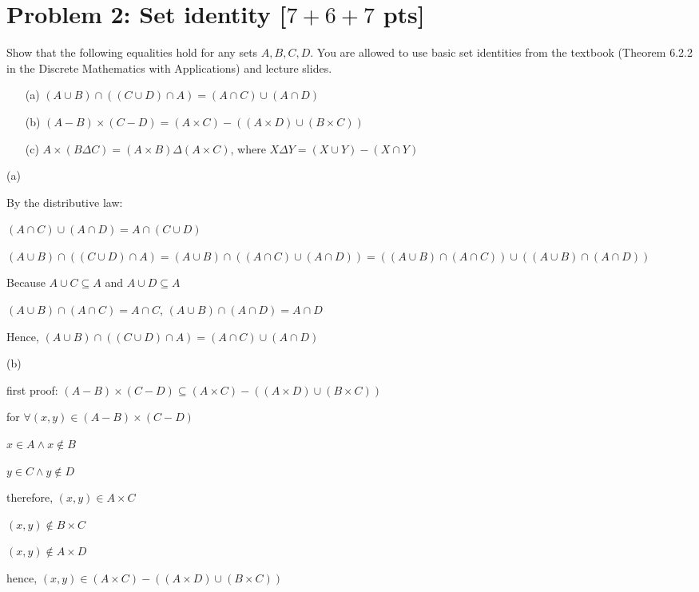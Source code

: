 \documentclass[11pt,twoside]{article}
\newcommand{\problem}[1]{\section*{Problem #1}}
\begin{document}
\problem{2: Set identity [$7+6+7$ pts]}
Show that the following equalities hold for any sets $A,B,C,D$. You are allowed to use basic set identities from the textbook (Theorem 6.2.2 in the Discrete Mathematics with Applications) and lecture slides. 

\begin{enumerate}
    \item[(a)] \( (A \cup B) \cap ((C \cup D) \cap A) = (A \cap C)\cup(A \cap D) \) 
    \item[(b)] $(A-B) \times (C-D) = (A \times C) - ((A \times D) \cup (B \times C))$
    \item[(c)] $A \times (B \Delta C) = (A \times B) \Delta (A \times C)$, where $X \Delta Y = (X \cup Y) - (X \cap Y)$
\end{enumerate}

\hspace*{\fill}

(a)

By the distributive law:

\((A \cap C)\cup(A \cap D) = A\cap(C \cup D)\) 

$ (A \cup B) \cap ((C \cup D) \cap A) = (A \cup B) \cap ((A \cap C)\cup(A \cap D)) = ((A \cup B) \cap (A \cap C))\cup ((A \cup B) \cap (A \cap D))$

Because $ A\cup C \subseteq A $ and $ A\cup D \subseteq A $

$(A \cup B) \cap (A \cap C) = A\cap C$, $(A \cup B) \cap (A \cap D) = A\cap D$

Hence, \( (A \cup B) \cap ((C \cup D) \cap A) = (A \cap C)\cup(A \cap D) \)


\hspace*{\fill}

(b) %

first proof:
$(A-B) \times (C-D)\subseteq (A \times C) - ((A \times D) \cup (B \times C))$

for $\forall (x, y) \in (A-B) \times (C-D)$

$x\in A \land x \notin B$

$y\in C \land y \notin D$

therefore, $(x,y) \in A \times C$

$(x,y) \notin B \times C$

$(x,y) \notin A \times D$

hence, $(x,y) \in (A \times C) - ((A \times D) \cup (B \times C))$
\end{document}
